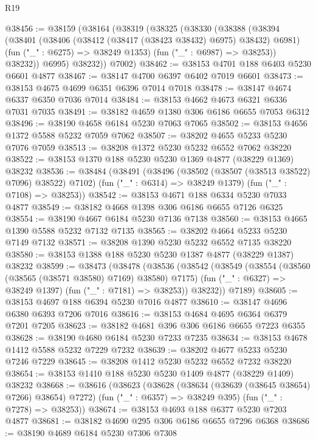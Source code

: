\begin{lexlean}{R19}
\begin{coremodule}
@38456 := @38159
    (@38164
      (@38319
        (@38325
          (@38330
            (@38388
              (@38394
                (@38401
                  (@38406 (@38412 (@38417 (@38423 @38432) @6975) @38432) @6981)
                  (fun ("_" : @6275) => @38249 @1353)
                  (fun ("_" : @6987) => @38253))
                @38232))
            @6995)
          @38232))
      @7002)
@38462 := @38153 @4701 @188 @6403 @5230 @6601 @4877
@38467 := @38147 @4700 @6397 @6402 @7019 @6601
@38473 := @38153 @4675 @4699 @6351 @6396 @7014 @7018
@38478 := @38147 @4674 @6337 @6350 @7036 @7014
@38484 := @38153 @4662 @4673 @6321 @6336 @7031 @7035
@38491 := @38182 @4659 @1380 @306 @6186 @6655 @7053 @6312
@38496 := @38190 @4658 @6184 @5230 @7063 @7065
@38502 := @38153 @4656 @1372 @5588 @5232 @7059 @7062
@38507 := @38202 @4655 @5233 @5230 @7076 @7059
@38513 := @38208 @1372 @5230 @5232 @6552 @7062 @38220
@38522 := @38153 @1370 @188 @5230 @5230 @1369 @4877 (@38229 @1369) @38232
@38536 := @38484
    (@38491
      (@38496 (@38502 (@38507 (@38513 @38522) @7096) @38522) @7102)
      (fun ("_" : @6314) => @38249 @1379)
      (fun ("_" : @7108) => @38253))
@38542 := @38153 @4671 @188 @6334 @5230 @7033 @4877
@38549 := @38182 @4668 @1398 @306 @6186 @6655 @7126 @6325
@38554 := @38190 @4667 @6184 @5230 @7136 @7138
@38560 := @38153 @4665 @1390 @5588 @5232 @7132 @7135
@38565 := @38202 @4664 @5233 @5230 @7149 @7132
@38571 := @38208 @1390 @5230 @5232 @6552 @7135 @38220
@38580 := @38153 @1388 @188 @5230 @5230 @1387 @4877 (@38229 @1387) @38232
@38599 := @38473
    (@38478
      (@38536
        (@38542
          (@38549
            (@38554 (@38560 (@38565 (@38571 @38580) @7169) @38580) @7175)
            (fun ("_" : @6327) => @38249 @1397)
            (fun ("_" : @7181) => @38253))
          @38232))
      @7189)
@38605 := @38153 @4697 @188 @6394 @5230 @7016 @4877
@38610 := @38147 @4696 @6380 @6393 @7206 @7016
@38616 := @38153 @4684 @4695 @6364 @6379 @7201 @7205
@38623 := @38182 @4681 @396 @306 @6186 @6655 @7223 @6355
@38628 := @38190 @4680 @6184 @5230 @7233 @7235
@38634 := @38153 @4678 @1412 @5588 @5232 @7229 @7232
@38639 := @38202 @4677 @5233 @5230 @7246 @7229
@38645 := @38208 @1412 @5230 @5232 @6552 @7232 @38220
@38654 := @38153 @1410 @188 @5230 @5230 @1409 @4877 (@38229 @1409) @38232
@38668 := @38616
    (@38623
      (@38628 (@38634 (@38639 (@38645 @38654) @7266) @38654) @7272)
      (fun ("_" : @6357) => @38249 @395)
      (fun ("_" : @7278) => @38253))
@38674 := @38153 @4693 @188 @6377 @5230 @7203 @4877
@38681 := @38182 @4690 @295 @306 @6186 @6655 @7296 @6368
@38686 := @38190 @4689 @6184 @5230 @7306 @7308

\end{coremodule}
\end{lexlean}
